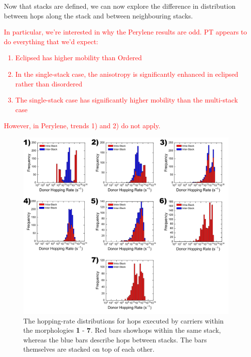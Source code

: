 \documentclass[12pt]{article}
\begin{document}
Now that stacks are defined, we can now explore the difference in distribution between hops along the stack and between neighbouring stacks.
\textcolor{red}{In particular, we're interested in why the Perylene results are odd.
    PT appears to do everything that we'd expect:
    \begin{enumerate}
        \item{Eclipsed has higher mobility than Ordered}
        \item{In the single-stack case, the anisotropy is significantly enhanced in eclipsed rather than disordered}
        \item{The single-stack case has significantly higher mobility than the multi-stack case}
    \end{enumerate}
    However, in Perylene, trends 1) and 2) do not apply.
}

\begin{figure}[h!]\centering
	\includegraphics[width=\textwidth]{Figures/DonorHoppingRateMixed.pdf}
    \caption{The hopping-rate distributions for hops executed by carriers within the morphologies \textbf{1} - \textbf{7}. Red bars showhops within the same stack, whereas the blue bars describe hops between stacks. The bars themselves are stacked on top of each other.}
	\label{fig:HoppingRateMixed}
\end{figure}
\end{document}
